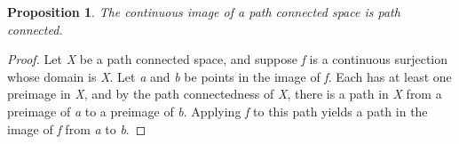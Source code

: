 \documentclass[12pt]{article}
\newtheorem*{proposition*}{Proposition}
\newcommand{\fm}[1]{{\it #1}}
\begin{document}
\begin{proposition*}
The continuous image of a path connected space is path connected.
\end{proposition*}

\begin{proof} 
Let \fm{X} be a path connected space, and suppose \fm{f} is a
continuous surjection whose domain is \fm{X}.  Let \fm{a} and \fm{b}
be points in the image of \fm{f}.  Each has at least one preimage in
\fm{X}, and by the path connectedness of \fm{X}, there is a path in
\fm{X} from a preimage of \fm{a} to a preimage of \fm{b}.  Applying
\fm{f} to this path yields a path in the image of \fm{f} from \fm{a}
to \fm{b}.
\end{proof}


\end{document}
